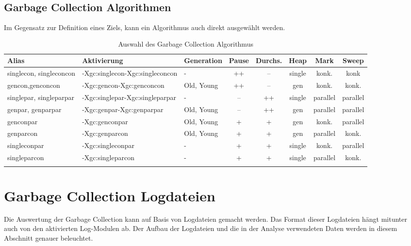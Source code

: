 \subsection{Garbage Collection Algorithmen}
Im Gegensatz zur Definition eines Ziels, kann ein Algorithmus auch direkt ausgewählt werden.
  \begin{longtable}{|p{2cm}|p{2.8cm}|l|c|c|c|c|c|}
    \hline
  \textbf{Alias} & \textbf{Aktivierung}& \textbf{Generation} & \textbf{Pause} &\textbf{Durchs.} & \textbf{Heap} & \textbf{Mark} & \textbf{Sweep} \\\hline
  singlecon, singleconcon & -Xgc:singlecon\newline-Xgc:singleconcon& - &++&--& single & konk. & konk\\\hline

  gencon,\newline genconcon& -Xgc:gencon\newline-Xgc:genconcon &Old, Young&++&-- & gen & konk. & konk.\\\hline	
 
  singlepar, \newline singleparpar& -Xgc:singlepar\newline-Xgc:singleparpar & - & -- & ++ & single & parallel & parallel \\\hline
  genpar, \newline genparpar& -Xgc:genpar\newline-Xgc:genparpar & Old, Young & -- & ++ & gen& parallel & parallel \\\hline
  genconpar &-Xgc:genconpar&Old, Young&+&+&gen& konk. & parallel \\\hline
  genparcon &-Xgc:genparcon&Old, Young&+&+&gen& parallel & konk. \\\hline
  singleconpar &-Xgc:singleconpar&-&+&+&single&konk. & parallel \\\hline
  singleparcon& -Xgc:singleparcon&-&+&+&single&parallel & konk. \\\hline
\caption{Auswahl des Garbage Collection Algorithmus}
  \end{longtable}

\section{Garbage Collection Logdateien}\label{jrockitgclog}
Die Auswertung der Garbage Collection kann auf Basis von Logdateien gemacht werden. Das Format dieser Logdateien hängt mitunter auch von den aktivierten Log-Modulen ab. Der Aufbau der Logdateien und die in der Analyse verwendeten Daten werden in diesem Abschnitt genauer beleuchtet.

